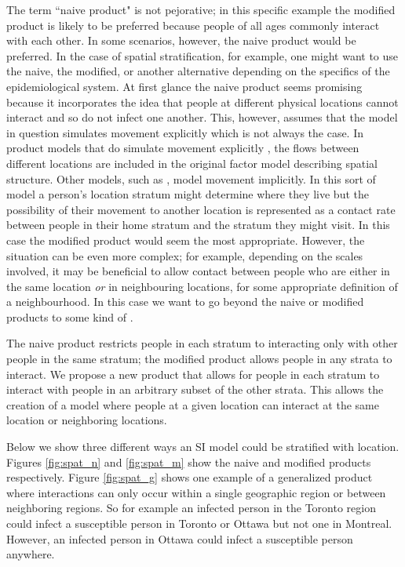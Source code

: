 The term ``naive product" is not pejorative; in this specific example the modified product is likely to be preferred because people of all ages commonly interact with each other. In some scenarios, however, the naive product would be preferred. In the case of spatial stratification, for example, one might want to use the naive, the modified, or another alternative depending on the specifics of the epidemiological system. At first glance the naive product seems promising because it incorporates the idea that people at different physical locations cannot interact and so do not infect one another. This, however, assumes that the model in question simulates movement explicitly which is not always the case. In product models that do simulate movement explicitly \cite[e.g.][]{mohammadi2023importation}, the flows between different locations are included in the original factor model describing spatial structure. Other models, such as \cite{dietz1995structured}, model movement implicitly. In this sort of model a person's location stratum might determine where they live but the possibility of their movement to another location is represented as a contact rate between people in their home stratum and the stratum they might visit. In this case the modified product would seem the most appropriate. However, the situation can be even more complex; for example, depending on the scales involved, it may be beneficial to allow contact between people who are either in the same location \emph{or} in neighbouring locations, for some appropriate definition of a neighbourhood. In this case we want to go beyond the naive or modified products to some kind of .


The naive product restricts people in each stratum to interacting only with other people in the same stratum; the modified product allows people in any strata to interact. We propose a new product that allows for people in each stratum to interact with people in an arbitrary subset of the other strata. This allows the creation of a model where people at a given location can interact at the same location or neighboring locations. 



Below we show three different ways an SI model could be stratified with location. Figures \ref{fig:spat_n} and \ref{fig:spat_m} show the naive and modified products respectively. Figure \ref{fig:spat_g} shows one example of a generalized product where interactions can only occur within a single geographic region or between neighboring regions. So for example an infected person in the Toronto region could infect a susceptible person in Toronto or Ottawa but not one in Montreal. However, an infected person in Ottawa could infect a susceptible person anywhere. 


